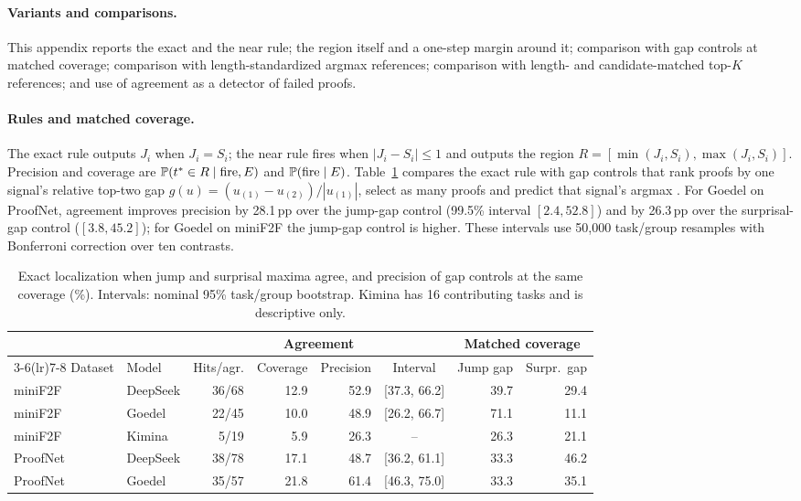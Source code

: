 \paragraph{Variants and comparisons.} This appendix reports the exact and the near rule; the region itself and a one-step margin around it; comparison with gap controls at matched coverage; comparison with length-standardized argmax references; comparison with length- and candidate-matched top-$K$ references; and use of agreement as a detector of failed proofs.

\paragraph{Rules and matched coverage.} The exact rule outputs $J_i$ when $J_i=S_i$; the near rule fires when $|J_i-S_i|\le1$ and outputs the region $R=[\min(J_i,S_i),\max(J_i,S_i)]$. Precision and coverage are $\mathbb{P}(t^*\in R\mid\text{fire},E)$ and $\mathbb{P}(\text{fire}\mid E)$. Table~\ref{tab:gap} compares the exact rule with gap controls that rank proofs by one signal's relative top-two gap $g(u)=(u_{(1)}-u_{(2)})/|u_{(1)}|$, select as many proofs and predict that signal's argmax \citep{geifman2019}. For Goedel on ProofNet, agreement improves precision by 28.1\,pp over the jump-gap control (99.5\% interval $[2.4, 52.8]$) and by 26.3\,pp over the surprisal-gap control ($[3.8, 45.2]$); for Goedel on miniF2F the jump-gap control is higher. These intervals use 50,000 task/group resamples with Bonferroni correction over ten contrasts.

\begin{table}[h]
\caption{Exact localization when jump and surprisal maxima agree, and precision of gap controls at the same coverage (\%). Intervals: nominal 95\% task/group bootstrap. Kimina has 16 contributing tasks and is descriptive only.}
\label{tab:gap}
\begin{center}
\small
\begin{tabular}{llrrrcrr}
\toprule
& & \multicolumn{4}{c}{Agreement} & \multicolumn{2}{c}{Matched coverage}\\
\cmidrule(lr){3-6}\cmidrule(lr){7-8}
Dataset & Model & Hits/agr. & Coverage & Precision & Interval & Jump gap & Surpr.\ gap\\
\midrule
miniF2F & DeepSeek & 36/68 & 12.9 & 52.9 & [37.3, 66.2] & 39.7 & 29.4\\
miniF2F & Goedel & 22/45 & 10.0 & 48.9 & [26.2, 66.7] & 71.1 & 11.1\\
miniF2F & Kimina & 5/19 & 5.9 & 26.3 & -- & 26.3 & 21.1\\
ProofNet & DeepSeek & 38/78 & 17.1 & 48.7 & [36.2, 61.1] & 33.3 & 46.2\\
ProofNet & Goedel & 35/57 & 21.8 & 61.4 & [46.3, 75.0] & 33.3 & 35.1\\
\bottomrule
\end{tabular}
\end{center}
\end{table}


